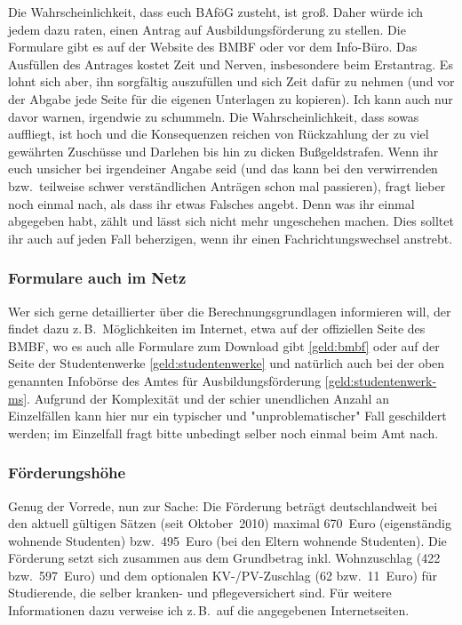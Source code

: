 \begin{multicols*}{2}
Die Wahrscheinlichkeit, dass euch BAföG zusteht, ist groß. Daher würde ich jedem dazu raten, einen Antrag auf Ausbildungsförderung zu stellen. Die Formulare gibt es auf der Website des BMBF oder vor dem Info-Büro. Das Ausfüllen des Antrages kostet Zeit und Nerven, insbesondere beim Erstantrag. Es lohnt sich aber, ihn sorgfältig auszufüllen und sich Zeit dafür zu nehmen (und vor der Abgabe jede Seite für die eigenen Unterlagen zu kopieren). Ich kann auch nur davor warnen, irgendwie zu schummeln. Die Wahrscheinlichkeit, dass sowas auffliegt, ist hoch und die Konsequenzen reichen von Rückzahlung der zu viel gewährten Zuschüsse und Darlehen bis hin zu dicken Bußgeldstrafen. Wenn ihr euch unsicher bei irgendeiner Angabe seid (und das kann bei den verwirrenden bzw.\ teilweise schwer verständlichen Anträgen schon mal passieren), fragt lieber noch einmal nach, als dass ihr etwas Falsches angebt. Denn was ihr einmal abgegeben habt, zählt und lässt sich nicht mehr ungeschehen machen. Dies solltet ihr auch auf jeden Fall beherzigen, wenn ihr einen Fachrichtungswechsel anstrebt.

\subsubsection*{Formulare auch im Netz}
Wer sich gerne detaillierter über die Berechnungsgrundlagen informieren will, der findet dazu z.\,B.\ Möglichkeiten im Internet, etwa auf der offiziellen Seite des BMBF, wo es auch alle Formulare zum Download gibt \cref{geld:bmbf} oder auf der Seite der Studentenwerke \cref{geld:studentenwerke} und natürlich auch bei der oben genannten Infobörse des Amtes für Ausbildungsförderung \cref{geld:studentenwerk-ms}. Aufgrund der Komplexität und der schier unendlichen Anzahl an Einzelfällen kann hier nur ein typischer und "unproblematischer" Fall geschildert werden; im Einzelfall fragt bitte unbedingt selber noch einmal beim Amt nach.

\subsubsection*{Förderungshöhe}
Genug der Vorrede, nun zur Sache: Die Förderung beträgt deutschlandweit bei den aktuell gültigen Sätzen (seit Oktober~2010) maximal 670~Euro (eigenständig wohnende Studenten) bzw.\ 495~Euro (bei den Eltern wohnende Studenten). Die Förderung setzt sich zusammen aus dem Grundbetrag inkl. Wohnzuschlag (422 bzw.\ 597~Euro) und dem optionalen KV-/PV-Zuschlag (62 bzw.\ 11~Euro) für Studierende, die selber kranken- und pflegeversichert sind. Für weitere Informationen dazu verweise ich z.\,B.\ auf die angegebenen Internetseiten.


\end{multicols*}
